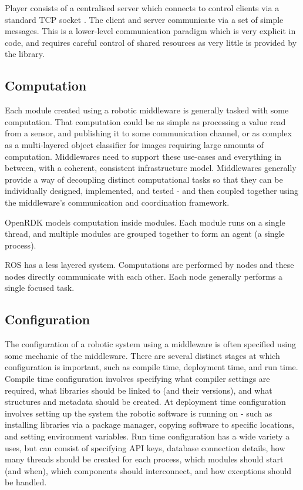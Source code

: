 \documentclass[../dissertation.tex]{subfiles}
\begin{document}
Player consists of a centralised server which connects to control clients via a standard TCP socket \cite{PlayerServerManual}. The client and server communicate via a set of simple messages. This is a lower-level communication paradigm which is very explicit in code, and requires careful control of shared resources as very little is provided by the library.

\subsection{Computation}

Each module created using a robotic middleware is generally tasked with some computation. That computation could be as simple as processing a value read from a sensor, and publishing it to some communication channel, or as complex as a multi-layered object classifier for images requiring large amounts of computation. Middlewares need to support these use-cases and everything in between, with a coherent, consistent infrastructure model. Middlewares generally provide a way of decoupling distinct computational tasks so that they can be individually designed, implemented, and tested - and then coupled together using the middleware's communication and coordination framework.

OpenRDK models computation inside modules. Each module runs on a single thread, and multiple modules are grouped together to form an agent (a single process).

ROS has a less layered system. Computations are performed by nodes and these nodes directly communicate with each other. Each node generally performs a single focused task.

\subsection{Configuration}

The configuration of a robotic system using a middleware is often specified using some mechanic of the middleware. There are several distinct stages at which configuration is important, such as compile time, deployment time, and run time. Compile time configuration involves specifying what compiler settings are required, what libraries should be linked to (and their versions), and what structures and metadata should be created. At deployment time configuration involves setting up the system the robotic software is running on - such as installing libraries via a package manager, copying software to specific locations, and setting environment variables. Run time configuration has a wide variety a uses, but can consist of specifying API keys, database connection details, how many threads should be created for each process, which modules should start (and when), which components should interconnect, and how exceptions should be handled.
\end{document}
